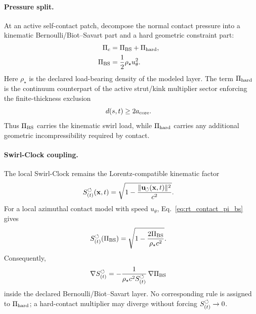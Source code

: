 \paragraph{Pressure split.}
At an active self-contact patch, decompose the normal contact pressure into a
kinematic Bernoulli/Biot--Savart part and a hard geometric constraint part:
\begin{align}
    \Pi_c
    &=
    \Pi_{\rm BS}
    +
    \Pi_{\rm hard},
    \label{eq:rt_contact_pressure_split}
    \\
    \Pi_{\rm BS}
    &=
    \frac12\rho_\star u_\theta^2 .
    \label{eq:rt_contact_pi_bs}
\end{align}
Here \(\rho_\star\) is the declared load-bearing density of the modeled layer.
The term \(\Pi_{\rm hard}\) is the continuum counterpart of the active
strut/kink multiplier sector enforcing the finite-thickness exclusion
\begin{equation}
    d(s,t)\ge 2a_{\rm core}.
    \label{eq:rt_contact_distance_exclusion}
\end{equation}
Thus \(\Pi_{\rm BS}\) carries the kinematic swirl load, while
\(\Pi_{\rm hard}\) carries any additional geometric incompressibility required
by contact.

\paragraph{Swirl-Clock coupling.}
The local Swirl-Clock remains the Lorentz-compatible kinematic factor
\begin{equation}
    S_{(t)}^{\boldsymbol{\circlearrowleft}}(\mathbf x,t)
    =
    \sqrt{
        1-
        \frac{\lVert\mathbf{u}_{\!\boldsymbol{\circlearrowleft}}(\mathbf x,t)\rVert^2}{c^2}
    } .
    \label{eq:rt_contact_swirl_clock_kinematic}
\end{equation}
For a local azimuthal contact model with speed \(u_\theta\),
Eq.~\eqref{eq:rt_contact_pi_bs} gives
\begin{equation}
    S_{(t)}^{\boldsymbol{\circlearrowleft}}(\Pi_{\rm BS})
    =
    \sqrt{
        1-
        \frac{2\Pi_{\rm BS}}{\rho_\star c^2}
    } .
    \label{eq:rt_contact_swirl_clock_pressure}
\end{equation}
Consequently,
\begin{equation}
    \nabla S_{(t)}^{\boldsymbol{\circlearrowleft}}
    =
    -\frac{1}{\rho_\star c^2S_{(t)}^{\boldsymbol{\circlearrowleft}}}\,
    \nabla\Pi_{\rm BS}
    \label{eq:rt_contact_swirl_clock_gradient_pressure}
\end{equation}
inside the declared Bernoulli/Biot--Savart layer.  No corresponding rule is
assigned to \(\Pi_{\rm hard}\); a hard-contact multiplier may diverge without
forcing \(S_{(t)}^{\boldsymbol{\circlearrowleft}}\to0\).

